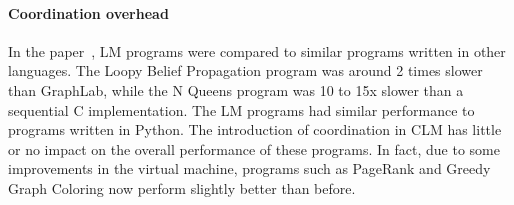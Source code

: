 \paragraph{Coordination overhead}

In the paper~\cite{cruz-ppdp14}, LM programs were compared to similar
programs written in other languages. The Loopy Belief Propagation
program was around 2 times slower than GraphLab, while the N Queens
program was 10 to 15x slower than a sequential C implementation. The
LM programs had similar performance to programs written in Python.
The introduction of coordination in CLM has little or no impact on the
overall performance of these programs.  In fact, due to some
improvements in the virtual machine, programs such as PageRank and
Greedy Graph Coloring now perform slightly better than before.
